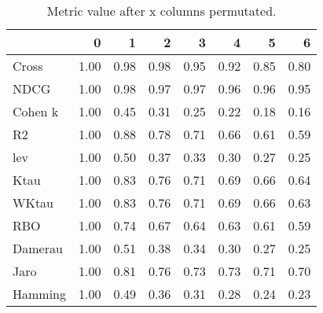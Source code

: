 \begin{table}[h]
\centering
\caption{Metric value after x columns permutated.}
\label{tab:data}
\begin{tabular}{l|r|r|r|r|r|r|r|}
\toprule
 & 0 & 1 & 2 & 3 & 4 & 5 & 6 \\
\midrule
Cross & 1.00 & 0.98 & 0.98 & 0.95 & 0.92 & 0.85 & 0.80 \\
NDCG & 1.00 & 0.98 & 0.97 & 0.97 & 0.96 & 0.96 & 0.95 \\
Cohen k & 1.00 & 0.45 & 0.31 & 0.25 & 0.22 & 0.18 & 0.16 \\
R2 & 1.00 & 0.88 & 0.78 & 0.71 & 0.66 & 0.61 & 0.59 \\
lev & 1.00 & 0.50 & 0.37 & 0.33 & 0.30 & 0.27 & 0.25 \\
Ktau & 1.00 & 0.83 & 0.76 & 0.71 & 0.69 & 0.66 & 0.64 \\
WKtau & 1.00 & 0.83 & 0.76 & 0.71 & 0.69 & 0.66 & 0.63 \\
RBO & 1.00 & 0.74 & 0.67 & 0.64 & 0.63 & 0.61 & 0.59 \\
Damerau & 1.00 & 0.51 & 0.38 & 0.34 & 0.30 & 0.27 & 0.25 \\
Jaro & 1.00 & 0.81 & 0.76 & 0.73 & 0.73 & 0.71 & 0.70 \\
Hamming & 1.00 & 0.49 & 0.36 & 0.31 & 0.28 & 0.24 & 0.23 \\
\bottomrule
\end{tabular}
\end{table}
